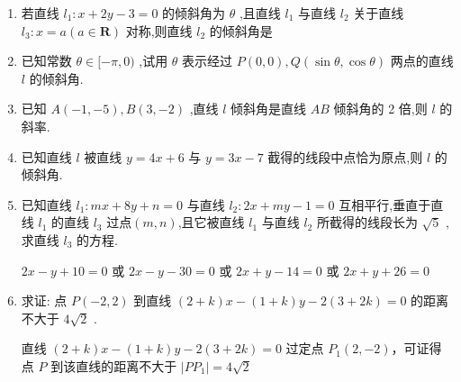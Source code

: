 \begin{enumerate}
    \item 若直线 ${l}_{1} : x + {2y} - 3 = 0$ 的倾斜角为 $\theta$ ,且直线 ${l}_{1}$ 与直线 ${l}_{2}$ 关于直线 ${l}_{3} : x = a\left( {a \in  \mathbf{R}}\right)$ 对称,则直线 ${l}_{2}$ 的倾斜角是
    
    \item 已知常数 $\theta  \in  \lbrack  - \pi ,0)$ ,试用 $\theta$ 表示经过 $P\left( {0,0}\right) ,Q\left( {\sin \theta ,\cos \theta }\right)$ 两点的直线 $l$ 的倾斜角.

    \item 已知 $A\left( {-1, - 5}\right) ,B\left( {3, - 2}\right)$ ,直线 $l$ 倾斜角是直线 ${AB}$ 倾斜角的 2 倍,则 $l$ 的斜率.

    \item 已知直线 $l$ 被直线 $y = {4x} + 6$ 与 $y = {3x} - 7$ 截得的线段中点恰为原点,则 $l$ 的倾斜角.

    \item 已知直线 ${l}_{1} : {mx} + {8y} + n = 0$ 与直线 ${l}_{2} : {2x} + {my} - 1 = 0$ 互相平行,垂直于直线 ${l}_{1}$ 的直线 ${l}_{3}$ 过点$(m, n)$,且它被直线 ${l}_{1}$ 与直线 ${l}_{2}$ 所截得的线段长为 $\sqrt{5}$ ,求直线 ${l}_{3}$ 的方程.
    \begin{jieda}
        ${2x} - y + {10} = 0$ 或 ${2x} - y - {30} = 0$ 或 ${2x} + y - {14} = 0$ 或 ${2x} + y + {26} = 0$
    \end{jieda}

    \item 求证: 点 $P\left( {-2,2}\right)$ 到直线 $\left( {2 + k}\right) x - \left( {1 + k}\right) y - 2\left( {3 + {2k}}\right)  = 0$ 的距离不大于 $4\sqrt{2}$ .
    \begin{jieda}
        直线 $\left( {2 + k}\right) x - \left( {1 + k}\right) y - 2\left( {3 + {2k}}\right)  = 0$ 过定点 ${P}_{1}\left( {2, - 2}\right)$，可证得点 $P$ 到该直线的距离不大于 $\left| {P{P}_{1}}\right|  = 4\sqrt{2}$
    \end{jieda}


\end{enumerate}
